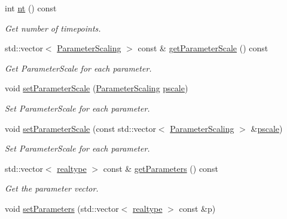 \begin{DoxyCompactItemize}
int \mbox{\hyperlink{classamici_1_1_model_a4c23d300cbe15b0afb1ee3731d47cc93}{nt}} () const
\begin{DoxyCompactList}\small\item\em Get number of timepoints. \end{DoxyCompactList}\item 
std\+::vector$<$ \mbox{\hyperlink{namespaceamici_a42f062082226e9284c201d9eab71a3a0}{Parameter\+Scaling}} $>$ const  \& \mbox{\hyperlink{classamici_1_1_model_ab14620b22a79748a09a88b9311a7f6d5}{get\+Parameter\+Scale}} () const
\begin{DoxyCompactList}\small\item\em Get Parameter\+Scale for each parameter. \end{DoxyCompactList}\item 
void \mbox{\hyperlink{classamici_1_1_model_a7e25febbfd9db80f64a4f73a2718bda7}{set\+Parameter\+Scale}} (\mbox{\hyperlink{namespaceamici_a42f062082226e9284c201d9eab71a3a0}{Parameter\+Scaling}} \mbox{\hyperlink{classamici_1_1_model_a5d1c7237dc998202fe1b3393b50f77ce}{pscale}})
\begin{DoxyCompactList}\small\item\em Set Parameter\+Scale for each parameter. \end{DoxyCompactList}\item 
void \mbox{\hyperlink{classamici_1_1_model_a64aee7434ee9f99f004d8dc8eb776bc6}{set\+Parameter\+Scale}} (const std\+::vector$<$ \mbox{\hyperlink{namespaceamici_a42f062082226e9284c201d9eab71a3a0}{Parameter\+Scaling}} $>$ \&\mbox{\hyperlink{classamici_1_1_model_a5d1c7237dc998202fe1b3393b50f77ce}{pscale}})
\begin{DoxyCompactList}\small\item\em Set Parameter\+Scale for each parameter. \end{DoxyCompactList}\item 
std\+::vector$<$ \mbox{\hyperlink{namespaceamici_a1bdce28051d6a53868f7ccbf5f2c14a3}{realtype}} $>$ const  \& \mbox{\hyperlink{classamici_1_1_model_a1bb7ee08df1e2e42da7dceb2100b6131}{get\+Parameters}} () const
\begin{DoxyCompactList}\small\item\em Get the parameter vector. \end{DoxyCompactList}\item 
void \mbox{\hyperlink{classamici_1_1_model_af1e95f6479d442fcb4c63d16763d4acd}{set\+Parameters}} (std\+::vector$<$ \mbox{\hyperlink{namespaceamici_a1bdce28051d6a53868f7ccbf5f2c14a3}{realtype}} $>$ const \&p)

\end{DoxyCompactItemize}
